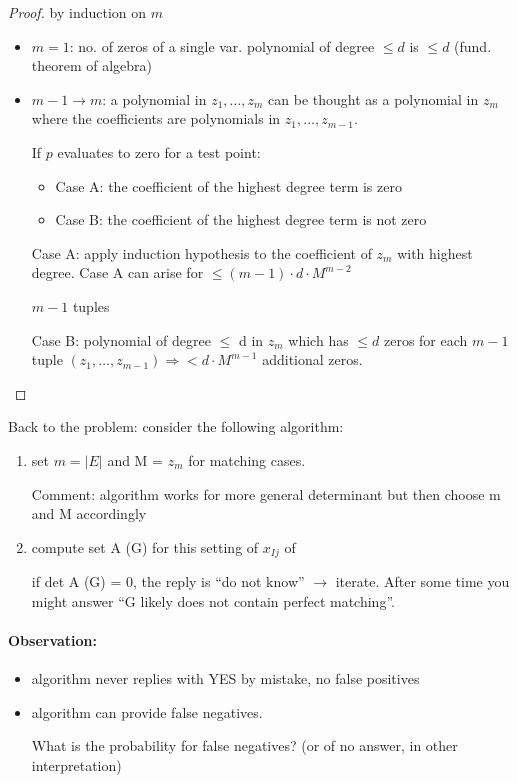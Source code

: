 \documentclass[11pt]{article}
\theoremstyle{definition}
\theoremstyle{definition}
\begin{document}
\begin{proof} by induction on $ m $

\begin{itemize}
\item $ m = 1 $: no. of zeros of a single var. polynomial of degree $ \leq d $ is $ \leq d $ (fund. theorem of algebra)
\item $ m - 1 \rightarrow m $: a polynomial in $ z_1, \dots, z_m $ can be thought as a polynomial in $ z_m $ where the coefficients are polynomials in $ z_1, \dots, z_{m-1} $.

If $ p $ evaluates to zero for a test point:
	\begin{itemize}
	\item Case A: the coefficient of the highest degree term is zero
	\item Case B: the coefficient of the highest degree term is not zero
	\end{itemize} \medskip
	
	Case A: apply induction hypothesis to the coefficient of $z_m$ with highest degree. Case A can arise for $\leq (m - 1) \cdot d \cdot M^{m - 2} $
	
	$ m -1$ tuples \bigskip
	
	Case B: polynomial of degree $ \leq $ d in $ z_m $ which has $ \leq d $ zeros for each $ m - 1 $ tuple $ (z_1, \dots, z_{m - 1} ) \Rightarrow < d \cdot M^{m - 1} $ additional zeros.
\end{itemize}

\end{proof}


Back to the problem: consider the following algorithm:

\begin {enumerate}
\item set $ m = |E| $ and M = $z_m $ for matching cases.

	Comment: algorithm works for more general determinant but then choose m and M accordingly
\item compute set A (G) for this setting of $x_{I j} $ of

if det A (G) = 0, the reply is ``do not know'' $ \rightarrow $ iterate. After some time you might answer ``G likely does not contain perfect matching''.
\end {enumerate}

\paragraph{Observation:}
\begin{itemize}
\item algorithm never replies with YES by mistake, no false positives

\item algorithm can provide false negatives.

What is the probability for false negatives? (or of no answer, in other interpretation)

\end{itemize}
\end{document}
